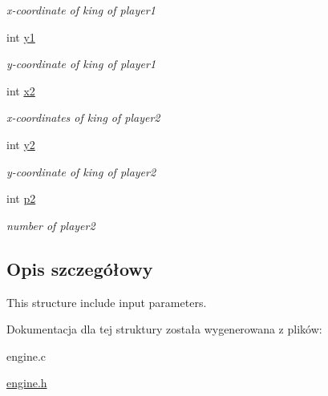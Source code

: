 \begin{DoxyCompactItemize}
\begin{DoxyCompactList}\small\item\em x-\/coordinate of king of player1 \end{DoxyCompactList}\item 
\hypertarget{structinput__parameters_a70e75e8878950f26b029c8bcd867dfb3}{int \hyperlink{structinput__parameters_a70e75e8878950f26b029c8bcd867dfb3}{y1}}\label{structinput__parameters_a70e75e8878950f26b029c8bcd867dfb3}

\begin{DoxyCompactList}\small\item\em y-\/coordinate of king of player1 \end{DoxyCompactList}\item 
\hypertarget{structinput__parameters_aeea7bd44e263a5f8d06384efd3bb5d0e}{int \hyperlink{structinput__parameters_aeea7bd44e263a5f8d06384efd3bb5d0e}{x2}}\label{structinput__parameters_aeea7bd44e263a5f8d06384efd3bb5d0e}

\begin{DoxyCompactList}\small\item\em x-\/coordinates of king of player2 \end{DoxyCompactList}\item 
\hypertarget{structinput__parameters_ae324caf4e1ac82a6baaef8a5234081c3}{int \hyperlink{structinput__parameters_ae324caf4e1ac82a6baaef8a5234081c3}{y2}}\label{structinput__parameters_ae324caf4e1ac82a6baaef8a5234081c3}

\begin{DoxyCompactList}\small\item\em y-\/coordinate of king of player2 \end{DoxyCompactList}\item 
\hypertarget{structinput__parameters_acb0783d0bc4681f5aab137eec42eed08}{int \hyperlink{structinput__parameters_acb0783d0bc4681f5aab137eec42eed08}{p2}}\label{structinput__parameters_acb0783d0bc4681f5aab137eec42eed08}

\begin{DoxyCompactList}\small\item\em number of player2 \end{DoxyCompactList}\end{DoxyCompactItemize}


\subsection{Opis szczegółowy}
This structure include input parameters. 

Dokumentacja dla tej struktury została wygenerowana z plików\-:\begin{DoxyCompactItemize}
\item 
engine.\-c\item 
\hyperlink{engine_8h}{engine.\-h}\end{DoxyCompactItemize}
